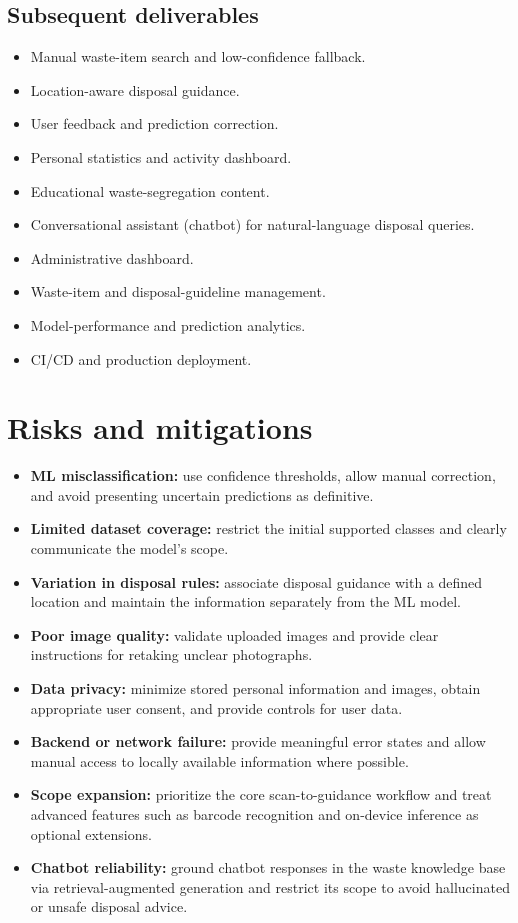 \documentclass[11pt,a4paper]{article}
\begin{document}
\subsection{Subsequent deliverables}

\begin{itemize}[leftmargin=0.7cm]
    \item Manual waste-item search and low-confidence fallback.
    \item Location-aware disposal guidance.
    \item User feedback and prediction correction.
    \item Personal statistics and activity dashboard.
    \item Educational waste-segregation content.
    \item Conversational assistant (chatbot) for natural-language disposal queries.
    \item Administrative dashboard.
    \item Waste-item and disposal-guideline management.
    \item Model-performance and prediction analytics.
    \item CI/CD and production deployment.
\end{itemize}

\section{Risks and mitigations}

\begin{itemize}[leftmargin=0.7cm]
    \item \textbf{ML misclassification:} use confidence thresholds, allow manual correction, and avoid presenting uncertain predictions as definitive.
    \item \textbf{Limited dataset coverage:} restrict the initial supported classes and clearly communicate the model's scope.
    \item \textbf{Variation in disposal rules:} associate disposal guidance with a defined location and maintain the information separately from the ML model.
    \item \textbf{Poor image quality:} validate uploaded images and provide clear instructions for retaking unclear photographs.
    \item \textbf{Data privacy:} minimize stored personal information and images, obtain appropriate user consent, and provide controls for user data.
    \item \textbf{Backend or network failure:} provide meaningful error states and allow manual access to locally available information where possible.
    \item \textbf{Scope expansion:} prioritize the core scan-to-guidance workflow and treat advanced features such as barcode recognition and on-device inference as optional extensions.
    \item \textbf{Chatbot reliability:} ground chatbot responses in the waste knowledge base via retrieval-augmented generation and restrict its scope to avoid hallucinated or unsafe disposal advice.
\end{itemize}
\end{document}
